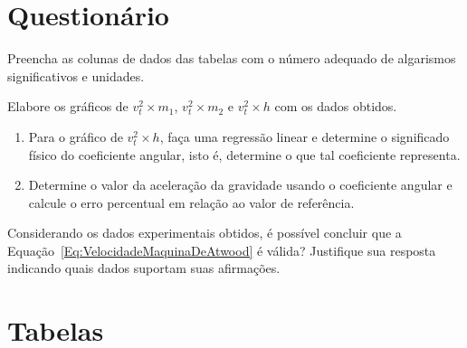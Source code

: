 \vspace{5mm}

\section{Questionário}

\begin{question}[type={exam}]
Preencha as colunas de dados das tabelas com o número adequado de algarismos significativos e unidades.
\end{question}

\begin{question}[type={exam}]
Elabore os gráficos de $v_t^2 \times m_1$, $v_t^2 \times m_2$ e $v_t^2 \times h$ com os dados obtidos.
\end{question}

\begin{question}[type={exam}]
\begin{enumerate}[label=\roman*.]
\item Para o gráfico de $v_t^2 \times h$, faça uma regressão linear e determine o significado físico do coeficiente angular, isto é, determine o que tal coeficiente representa.
\item Determine o valor da aceleração da gravidade usando o coeficiente angular e calcule o erro percentual em relação ao valor de referência.
\end{enumerate}
\end{question}

\begin{question}[type={exam}]
Considerando os dados experimentais obtidos, é possível concluir que a Equação~\eqref{Eq:VelocidadeMaquinaDeAtwood} é válida? Justifique sua resposta indicando quais dados suportam suas afirmações.
\end{question}

\vfill
\pagebreak
\section{Tabelas}

